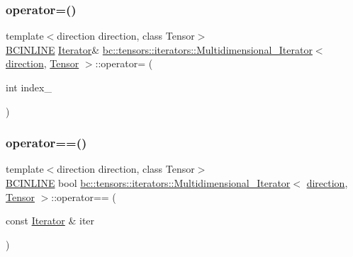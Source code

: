 \subsubsection{\texorpdfstring{operator=()}{operator=()}}
{\footnotesize\ttfamily template$<$direction direction, class Tensor$>$ \\
\hyperlink{common_8h_a6699e8b0449da5c0fafb878e59c1d4b1}{B\+C\+I\+N\+L\+I\+NE} \hyperlink{structbc_1_1tensors_1_1iterators_1_1Multidimensional__Iterator_a12d78eb95b3b0fbee7c824f0a79c1513}{Iterator}\& \hyperlink{structbc_1_1tensors_1_1iterators_1_1Multidimensional__Iterator}{bc\+::tensors\+::iterators\+::\+Multidimensional\+\_\+\+Iterator}$<$ \hyperlink{namespacebc_1_1tensors_1_1iterators_ae76efe63fb9cb4985d5e4e6af0ebf296}{direction}, \hyperlink{namespacebc_a659391e47ab612be3ba6c18cf9c89159}{Tensor} $>$\+::operator= (\begin{DoxyParamCaption}\item[{int}]{index\+\_\+ }\end{DoxyParamCaption})\hspace{0.3cm}{\ttfamily [inline]}}

\mbox{\label{structbc_1_1tensors_1_1iterators_1_1Multidimensional__Iterator_a191f9599715f6ef292d22eaab0b5885d}} 
\subsubsection{\texorpdfstring{operator==()}{operator==()}}
{\footnotesize\ttfamily template$<$direction direction, class Tensor$>$ \\
\hyperlink{common_8h_a6699e8b0449da5c0fafb878e59c1d4b1}{B\+C\+I\+N\+L\+I\+NE} bool \hyperlink{structbc_1_1tensors_1_1iterators_1_1Multidimensional__Iterator}{bc\+::tensors\+::iterators\+::\+Multidimensional\+\_\+\+Iterator}$<$ \hyperlink{namespacebc_1_1tensors_1_1iterators_ae76efe63fb9cb4985d5e4e6af0ebf296}{direction}, \hyperlink{namespacebc_a659391e47ab612be3ba6c18cf9c89159}{Tensor} $>$\+::operator== (\begin{DoxyParamCaption}\item[{const \hyperlink{structbc_1_1tensors_1_1iterators_1_1Multidimensional__Iterator_a12d78eb95b3b0fbee7c824f0a79c1513}{Iterator} \&}]{iter }\end{DoxyParamCaption})\hspace{0.3cm}{\ttfamily [inline]}}

